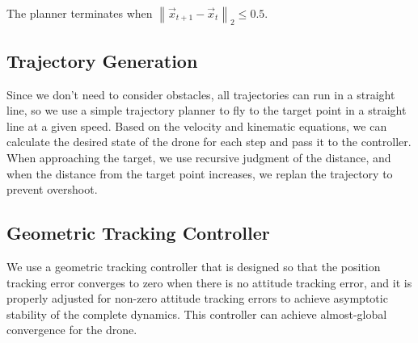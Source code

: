 \documentclass[conference]{IEEEtran}
\begin{document}
The planner terminates when $\left\|\Vec{x}_{t+1} - \Vec{x}_{t}\right\|_2 \leq 0.5$.

\subsection{Trajectory Generation}
Since we don't need to consider obstacles, all trajectories can run in a straight line, so we use a simple trajectory planner to fly to the target point in a straight line at a given speed. Based on the velocity and kinematic equations, we can calculate the desired state of the drone for each step and pass it to the controller. When approaching the target, we use recursive judgment of the distance, and when the distance from the target point increases, we replan the trajectory to prevent overshoot.

\subsection{Geometric Tracking Controller}
We use a geometric tracking controller \cite{5717652} that is designed so that the position tracking error converges to zero when there is no attitude tracking error, and it is properly adjusted for non-zero attitude tracking errors to achieve asymptotic stability of the complete dynamics. This controller can achieve almost-global convergence for the drone.
\end{document}

